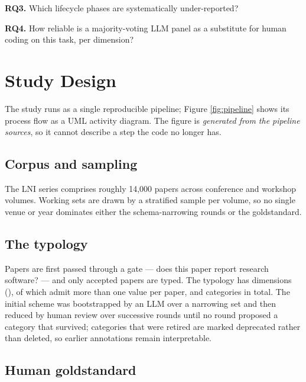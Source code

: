 \documentclass[
        pdflatex,sn-basic,lineno
    ]{sn-jnl}
\begin{document}
    \textbf{RQ3.} Which lifecycle phases are systematically
    under-reported?

    \textbf{RQ4.} How reliable is a majority-voting LLM panel as a
    substitute for human coding on this task, per dimension?

    \section{Study Design}\label{sec-design}

    The study runs as a single reproducible pipeline; Figure
    \ref{fig:pipeline} shows its process flow as a UML activity diagram.
    The figure is \emph{generated from the pipeline sources}, so it
    cannot describe a step the code no longer has.

    

    \subsection{Corpus and sampling}\label{corpus-and-sampling}

    The LNI series comprises roughly 14,000 papers across conference and
    workshop volumes. Working sets are drawn by a stratified sample per
    volume, so no single venue or year dominates either the
    schema-narrowing rounds or the goldstandard.

    \subsection{The typology}\label{the-typology}

    Papers are first passed through a gate --- does this paper report
    research software? --- and only accepted papers are typed. The
    typology has \NumDimensions dimensions (\DimensionList), of which
    \NumMultiDimensions admit more than one value per paper, and
    \NumCategories categories in total. The initial scheme was
    bootstrapped by an LLM over a narrowing set and then reduced by
    human review over successive rounds until no round proposed a
    category that survived; categories that were retired are marked
    deprecated rather than deleted, so earlier annotations remain
    interpretable.

    \subsection{Human goldstandard}\label{human-goldstandard}
\end{document}

